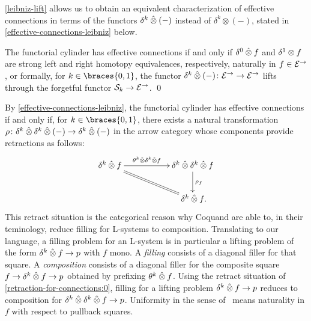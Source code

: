 \documentclass[reqno,10pt,a4paper,oneside,draft]{amsart}
\begin{document}
\cref{leibniz-lift} allows us to obtain an equivalent characterization of effective connections in terms of the functors $\delta^k \mathbin{\hat{\otimes}} (-)$ instead of $\delta^k \otimes (-)$, stated in \cref{effective-connections-leibniz} below.

\begin{corollary} \label{effective-connections-leibniz}
The functorial cylinder has effective connections if and only if $\delta^0 \mathbin{\hat{\otimes}} f$ and $\delta^1 \otimes f$ are strong left and right homotopy equivalences, respectively, naturally in $f \in \mathcal{E}^\to$, or formally, for $k \in \braces{0, 1}$, the functor $\delta^k \mathbin{\hat{\otimes}} (-) \colon \mathcal{E}^\to \to \mathcal{E}^\to$ lifts through the forgetful functor $\mathcal{S}_k \to \mathcal{E}^\to$.
\qed
\end{corollary}

\begin{remark} \label{retraction-for-connections}
By \cref{effective-connections-leibniz}, the functorial cylinder has effective connections if and only if, for $k \in \braces{0, 1}$, there exists a natural transformation $\rho \colon \delta^k \mathbin{\hat{\otimes}} \delta^k \mathbin{\hat{\otimes}} (-) \to \delta^k \mathbin{\hat{\otimes}} (-)$ in the arrow category whose components provide retractions as follows:
\begin{equation} \label{retraction-for-connections:0}
\xymatrix@C+3em{
  \kcyl \hatotimes f
  \ar[r]^-{\thetak \hatotimes \kcyl \hatotimes f}
  \ar@{=}[dr]
&
  \kcyl \hatotimes \kcyl \hatotimes f
  \ar[d]^{\rho_f}
\\&
  \kcyl \hatotimes f
\rlap{.}}
\end{equation}
This retract situation is the categorical reason why Coquand \etal\cite{coquand-variation} are able to, in their teminology, reduce filling for L-systems to composition.
Translating to our language, a filling problem for an L-system is in particular a lifting problem of the form $\delta^k \mathbin{\hat{\otimes}} f \to p$ with $f$ mono.
A \emph{filling} consists of a diagonal filler for that square.
A \emph{composition} consists of a diagonal filler for the composite square $f \to \delta^k \mathbin{\hat{\otimes}} f \to p$ obtained by prefixing $\theta^k \mathbin{\hat{\otimes}} f$.
Using the retract situation of \eqref{retraction-for-connections:0}, filling for a lifting problem $\delta^k \mathbin{\hat{\otimes}} f \to p$ reduces to composition for $\delta^k \mathbin{\hat{\otimes}} \delta^k \mathbin{\hat{\otimes}} f \to p$.
Uniformity in the sense of~\cite{coquand-variation} means naturality in $f$ with respect to pullback squares.
\end{remark}
\end{document}

